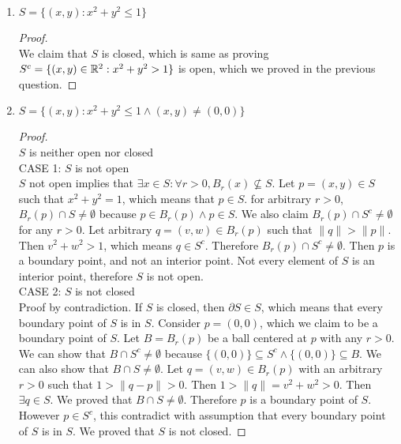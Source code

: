 \documentclass[11pt]{article}
\begin{document}
\begin{enumerate}
\begin{proof}
\begin{case}
\begin{align*}
        \| q \| + \| p-q\| &\geq \|p\| \tag{Triangular inequality}\\
        \| q\| + \frac{d-1}{2} &\geq d\tag{$\|p\| = d \land \|p-q\| \leq r = \frac{d-1}{2}$} \\
        \|q\| &\geq \frac{d+1}{2} \\
        \|q\| &> 1 \tag{$d>1$}
      \end{align*}
      Therefore $q\in S_2$. Then $S_2$ is open. \\
    \end{case}
    The union of two open sets are open as proved previously. Then $S$ is open.
  \end{proof}

  \item $S = \{ (x,y): x^2 + y^2 \leq 1\}$
  \begin{proof}
    $ $ \\
    We claim that $S$ is closed, which is same as proving $S^c = \{ (x,y)\in \mathbb{R}^2: x^2 + y^2 > 1\}$ is open, which we proved in the previous question.
  \end{proof}

  \item $S = \{ (x,y): x^2 + y^2 \leq 1 \land (x,y) \neq (0,0)\}$
  \begin{proof}
    $ $\\
    $S$ is neither open nor closed \\
    CASE 1:
      $S$ is not open \\
      $S$ not open implies that $\exists x\in S: \forall r>0, B_r(x)\not\subseteq S$. Let $p = (x,y)\in S$ such that $x^2 + y^2 = 1$, which means that $p\in S$. for arbitrary $r>0$, $B_r(p)\cap S \neq \emptyset$ because $p\in B_r(p) \land p\in S$. We also claim $B_r(p)\cap S^c \neq \emptyset$ for any $r>0$. Let arbitrary $q = (v,w)\in B_r(p)$ such that $\|q\| > \|p\|$. Then $v^2 + w^2 > 1$, which means $q\in S^c$. Therefore $B_r(p)\cap S^c \neq \emptyset$. Then $p$ is a boundary point, and not an interior point. Not every element of $S$ is an interior point, therefore $S$ is not open.  \\
    CASE 2:
      $S$ is not closed \\
      Proof by contradiction. If $S$ is closed, then $\partial S \in S$, which means that every boundary point of $S$ is in $S$. Consider $p = (0,0)$, which we claim to be a boundary point of $S$. Let $B = B_r(p)$ be a ball centered at $p$ with any $r>0$. We can show that $B\cap S^c \neq \emptyset$ because $\{(0,0)\} \subseteq S^c \land \{(0,0)\}\subseteq B$. We can also show that $B\cap S \neq \emptyset$. Let $q = (v,w)\in B_r(p)$ with an arbitrary $r>0$ such that $1> \|q-p\| > 0$. Then $1 > \|q\| = v^2 + w^2 > 0$. Then $\exists q \in S$. We proved that $B\cap S \neq \emptyset$. Therefore $p$ is a boundary point of $S$. However $p\in S^c$, this contradict with assumption that every boundary point of $S$ is in $S$. We proved that $S$ is not closed.
  \end{proof}


\end{enumerate}
\end{document}
